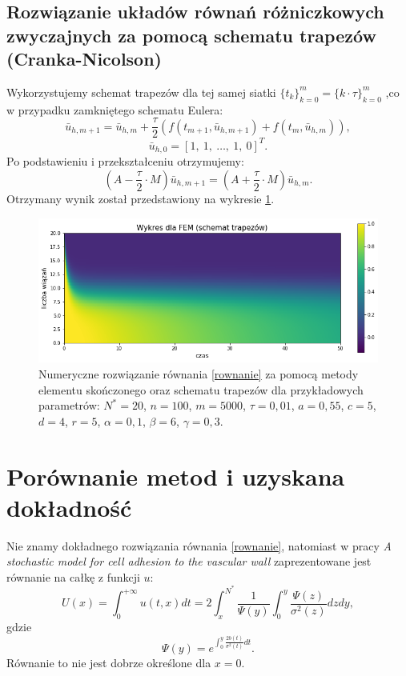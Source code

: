 \documentclass{article}
\begin{document}
\subsection{Rozwiązanie układów równań różniczkowych zwyczajnych za pomocą schematu trapezów (Cranka-Nicolson)} 
Wykorzystujemy schemat trapezów dla tej samej siatki $\{t_k\}_{k=0}^{m} = \{k\cdot\tau\}_{k=0}^{m}$ ,co w przypadku zamkniętego schematu Eulera:
\begin{equation*}
\bar{u}_{h,m+1} = \bar{u}_{h,m} + \frac{\tau}{2} ( f(t_{m+1}, \bar{u}_{h,m+1}) + f(t_{m}, \bar{u}_{h,m}) ),
\end{equation*}
\begin{equation*}
\bar{u}_{h,0} = [1, \ 1, \ \dots, \ 1, \ 0]^{T}.
\end{equation*}
Po podstawieniu i przekształceniu otrzymujemy:
\begin{equation*}
(A - \frac{\tau}{2} \cdot M)\bar{u}_{h,m+1} = (A + \frac{\tau}{2} \cdot M) \bar{u}_{h,m}.
\end{equation*}
Otrzymany wynik został przedstawiony na wykresie \ref{mes trapezy}.
\begin{figure}[h!]
	\centering
	\includegraphics[width=\textwidth]{images/wykres_fem_trapezy.pdf}
	\caption{Numeryczne rozwiązanie równania \eqref{rownanie} za pomocą metody elementu skończonego oraz schematu trapezów dla przykładowych parametrów: $N^{*}=20$, $n=100$, $m=5000$, $\tau=0,01$, $a=0,55$, $c=5$, $d=4$, $r=5$, $\alpha=0,1$, $\beta=6$, $\gamma=0,3$. }\label{mes trapezy}
\end{figure}


\section{Porównanie metod i uzyskana dokładność}

Nie znamy dokładnego rozwiązania równania \eqref{rownanie}, natomiast w pracy \textit{A stochastic model for cell adhesion to the vascular wall} zaprezentowane jest równanie na całkę z funkcji $u$:
\begin{equation*}
U (x) = \int_{0}^{+ \infty } u(t,x) dt = 2 \int_{x}^{N^{*}} \frac{1}{\Psi (y)} \int_{0}^{y} \frac{\Psi (z)}{\sigma^{2} (z)} dz dy,
\end{equation*}
gdzie
\begin{equation*}
\Psi (y) = e^{\int_{0}^{y} \frac{2 b(t)}{\sigma^{2} (t)} dt}.
\end{equation*}
Równanie to nie jest dobrze określone dla $x=0$.
\end{document}
